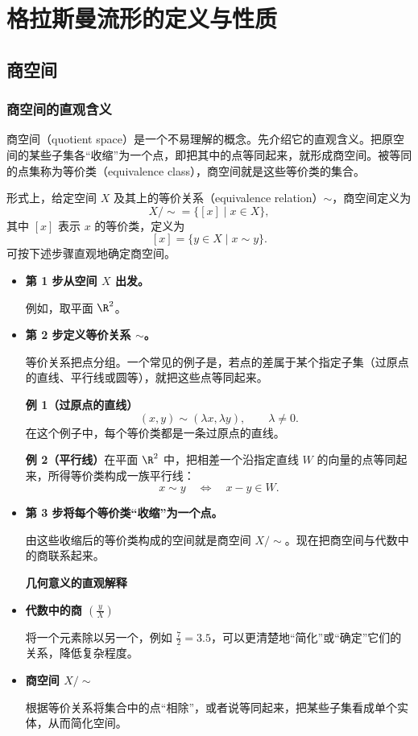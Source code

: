 \section{格拉斯曼流形的定义与性质}
\subsection{商空间}
\subsubsection{商空间的直观含义}
商空间（quotient space）是一个不易理解的概念。先介绍它的直观含义。把原空间的某些子集各“收缩”为一个点，即把其中的点等同起来，就形成商空间。被等同的点集称为等价类（equivalence class），商空间就是这些等价类的集合。

形式上，给定空间 $X$ 及其上的等价关系（equivalence relation）$\sim$，商空间定义为
\[
  X/{\sim}=\{[x]\mid x\in X\},
\]
其中 $[x]$ 表示 $x$ 的等价类，定义为
\[
  [x]=\{y\in X\mid x\sim y\}.
\]
可按下述步骤直观地确定商空间。
\begin{itemize}
  \item \textbf{第 1 步\quad 从空间 $X$ 出发。}

  例如，取平面 $\R^2$。
  \item \textbf{第 2 步\quad 定义等价关系 $\sim$。}

  等价关系把点分组。一个常见的例子是，若点的差属于某个指定子集（过原点的直线、平行线或圆等），就把这些点等同起来。

  \textbf{例 1（过原点的直线）}
  \[
    (x,y)\sim(\lambda x,\lambda y),\qquad \lambda\ne0.
  \]
  在这个例子中，每个等价类都是一条过原点的直线。

  \textbf{例 2（平行线）}\quad 在平面 $\R^2$ 中，把相差一个沿指定直线 $W$ 的向量的点等同起来，所得等价类构成一族平行线：
  \[
    x\sim y\quad\Longleftrightarrow\quad x-y\in W.
  \]
  \item \textbf{第 3 步\quad 将每个等价类“收缩”为一个点。}

  由这些收缩后的等价类构成的空间就是商空间 $X/{\sim}$。现在把商空间与代数中的商联系起来。

  \textbf{几何意义的直观解释}
  \item \textbf{代数中的商 $\left(\frac{y}{X}\right)$}

  将一个元素除以另一个，例如 $\frac{7}{2}=3.5$，可以更清楚地“简化”或“确定”它们的关系，降低复杂程度。
  \item \textbf{商空间 $X/{\sim}$}

  根据等价关系将集合中的点“相除”，或者说等同起来，把某些子集看成单个实体，从而简化空间。
\end{itemize}

